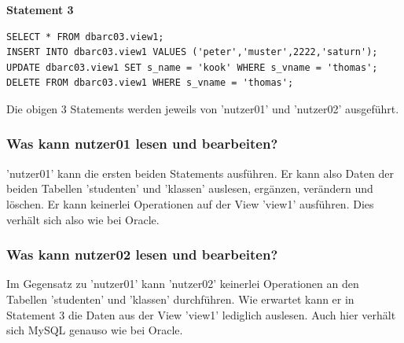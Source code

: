 \documentclass[10pt]{scrreprt}
\newcommand{\Bold}[1]{\textbf{#1}} %
\begin{document}
\Bold{Statement 3}
\begin{lstlisting}[style=sql]
SELECT * FROM dbarc03.view1;
INSERT INTO dbarc03.view1 VALUES ('peter','muster',2222,'saturn');
UPDATE dbarc03.view1 SET s_name = 'kook' WHERE s_vname = 'thomas';
DELETE FROM dbarc03.view1 WHERE s_vname = 'thomas';
\end{lstlisting}
Die obigen 3 Statements werden jeweils von 'nutzer01' und 'nutzer02' ausgeführt.
\subsubsection{Was kann nutzer01 lesen und bearbeiten?}
'nutzer01' kann die ersten beiden Statements ausführen. Er kann also Daten der beiden Tabellen 'studenten' und 'klassen' auslesen, ergänzen, verändern und löschen. Er kann keinerlei Operationen auf der View 'view1' ausführen. Dies verhält sich also wie bei Oracle.
\subsubsection{Was kann nutzer02 lesen und bearbeiten?}
Im Gegensatz zu 'nutzer01' kann 'nutzer02' keinerlei Operationen an den Tabellen 'studenten' und 'klassen' durchführen. Wie erwartet kann er in Statement 3 die Daten aus der View 'view1' lediglich auslesen. Auch hier verhält sich MySQL genauso wie bei Oracle.
\end{document}
